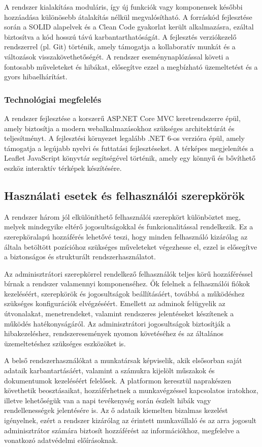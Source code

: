 A rendszer kialakítása moduláris, így új funkciók vagy komponensek későbbi hozzáadása különösebb átalakítás nélkül megvalósítható. A forráskód fejlesztése során a SOLID alapelvek és a Clean Code gyakorlat került alkalmazásra, ezáltal biztosítva a kód hosszú távú karbantarthatóságát. A fejlesztés verziókezelő rendszerrel (pl. Git) történik, amely támogatja a kollaboratív munkát és a változások visszakövethetőségét. A rendszer eseménynaplózással követi a fontosabb műveleteket és hibákat, elősegítve ezzel a megbízható üzemeltetést és a gyors hibaelhárítást.

\subsubsection{Technológiai megfelelés}

A rendszer fejlesztése a korszerű ASP.NET Core MVC keretrendszerre épül, amely biztosítja a modern webalkalmazásokhoz szükséges architektúrát és teljesítményt. A fejlesztési környezet legalább .NET 6-os verzióra épül, amely támogatja a legújabb nyelvi és futtatási fejlesztéseket. A térképes megjelenítés a Leaflet JavaScript könyvtár segítségével történik, amely egy könnyű és bővíthető eszköz interaktív térképek készítésére.

\newpage
\subsection{Használati esetek és felhasználói szerepkörök}

A rendszer három jól elkülöníthető felhasználói szerepkört különböztet meg, melyek mindegyike eltérő jogosultságokkal és funkcionalitással rendelkezik. Ez a szerepköralapú hozzáférés lehetővé teszi, hogy minden felhasználó kizárólag az általa betöltött pozícióhoz szükséges műveleteket végezhesse el, ezzel is elősegítve a biztonságos és strukturált rendszerhasználatot.

Az adminisztrátori szerepkörrel rendelkező felhasználók teljes körű hozzáféréssel bírnak a rendszer valamennyi komponenséhez. Ők felelnek a felhasználói fiókok kezeléséért, szerepkörök és jogosultságok beállításáért, továbbá a működéshez szükséges konfigurációk elvégzéséért. Emellett az adminok felügyelik az útvonalakat, menetrendeket, valamint rendszeres jelentéseket készítenek a működés hatékonyságáról. Az adminisztrátori jogosultságok biztosítják a hibakezeléshez, rendszeresemények nyomon követéséhez és az általános üzemeltetéshez szükséges eszközöket is.

A belső rendszerhasználókat a munkatársak képviselik, akik elsősorban saját adataik karbantartásáért, valamint a számukra kijelölt műszakok és dokumentumok kezeléséért felelősek. A platformon keresztül naprakészen követhetik beosztásaikat, hozzáférhetnek a munkavégzéssel kapcsolatos iratokhoz, illetve lehetőségük van a napi tevékenység során észlelt hibák vagy rendellenességek jelentésére is. Az ő adataik kiemelten bizalmas kezelést igényelnek, ezért a rendszer kizárólag az érintett munkavállaló és az arra jogosult adminisztrátor számára biztosít hozzáférést az információkhoz, megfelelve a vonatkozó adatvédelmi előírásoknak.

